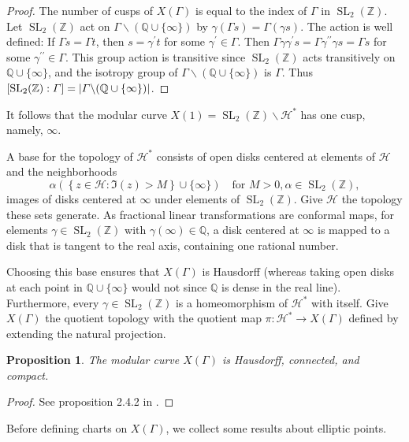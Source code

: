 \documentclass[10pt,leqno,twoside]{article}
\theoremstyle{plain}
\newtheorem{proposition}[lem]{Proposition}
\theoremstyle{definition}
\numberwithin{equation}{section}
\numberwithin{lem}{section}
\newcommand{\cbr}[1]{\left\{#1\right\}}
\DeclareMathOperator{\SL}{SL}
\newcommand{\slz}{\SL_2(\mathbb{Z})}
\begin{document}
\begin{proof}
    The number of cusps of $X(\varGamma)$ is equal to the index of $\varGamma$ in $\slz$. Let $\slz$ act on $\varGamma\backslash(\mathbb Q \cup \{\infty\})$ by $\gamma(\varGamma s) = \varGamma (\gamma s)$. The action is well defined: If $\varGamma s = \varGamma t$, then $s = \gamma^\prime t$ for some $\gamma^\prime \in \varGamma$. Then $\varGamma \gamma\gamma^\prime s = \varGamma\gamma^{\prime\prime}\gamma s = \varGamma s$ for some $\gamma^{\prime\prime}\in\varGamma$. This group action is transitive since $\slz$ acts transitively on $\mathbb Q \cup \{\infty\}$, and the isotropy group of $\varGamma\backslash(\mathbb Q \cup \{\infty\})$ is $\varGamma$. Thus $[\slz:\varGamma] = \abs{\varGamma\backslash (\mathbb Q\cup \{\infty\})}$.
\end{proof}

It follows that the modular curve $X(1) = \slz\backslash \mathcal H^\ast$ has one cusp, namely, $\infty$.

A base for the topology of $\mathcal H^\ast$ consists of open disks centered at elements of $\mathcal H$ and the neighborhoods 
\[\alpha(\cbr{z\in\mathcal H : \Im(z) > M}\cup\{\infty\})\quad \text{for $M>0,\alpha\in\slz$},\] images of disks centered at $\infty$ under elements of $\slz$. Give $\mathcal H$ the topology these sets generate. As fractional linear transformations are conformal maps, for elements $\gamma\in\slz$ with $\gamma(\infty)\in\mathbb Q$, a disk centered at $\infty$ is mapped to a disk that is tangent to the real axis, containing one rational number.

Choosing this base ensures that $X(\varGamma)$ is Hausdorff (whereas taking open disks at each point in $\mathbb Q \cup \{\infty\}$ would not since $\mathbb Q$ is dense in the real line). Furthermore, every $\gamma\in \slz$ is a homeomorphism of $\mathcal H^\ast$ with itself. Give $X(\varGamma)$ the quotient topology with the quotient map $\pi\colon \mathcal H^\ast\to X(\varGamma)$ defined by extending the natural projection.

\begin{proposition}
    The modular curve $X(\varGamma)$ is Hausdorff, connected, and compact. 
\end{proposition}
\begin{proof}
    See proposition 2.4.2 in \cite{diamond}.
\end{proof}

Before defining charts on $X(\varGamma)$, we collect some results about elliptic points.
\end{document}
